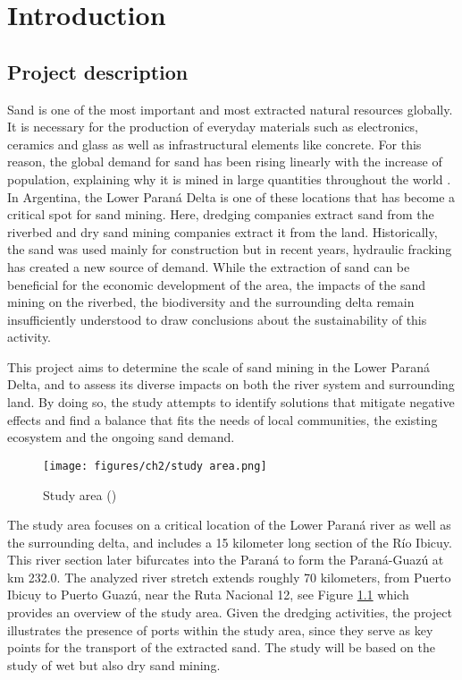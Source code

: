 \chapter{Introduction}
\label{chapter:introduction}

\section{Project description}

Sand is one of the most important and most extracted natural resources globally. It is necessary for the production of everyday materials such as electronics, ceramics and glass as well as infrastructural elements like concrete. For this reason, the global demand for sand has been rising linearly with the increase of population, explaining why it is mined in large quantities throughout the world \autocite{wwfRisingDemandSand}. 
In Argentina, the Lower Paraná Delta is one of these locations that has become a critical spot for sand mining. Here, dredging companies extract  sand from the riverbed and dry sand mining companies extract it from the land. Historically, the sand was used mainly for construction but in recent years, hydraulic fracking has created a new source of demand.
While the extraction of sand can be beneficial for the economic development of the area, the impacts of the sand mining on the riverbed, the biodiversity and the surrounding delta remain insufficiently understood to draw conclusions about the sustainability of this activity. 

This project aims to determine the scale of sand mining in the Lower Paraná Delta, and to assess its diverse impacts on both the river system and surrounding land. By doing so, the study attempts to identify solutions that mitigate negative effects and find a balance that fits the needs of local communities, the existing ecosystem and the ongoing sand demand. 

\begin{figure}[H]
    \centering    \texttt{[image: figures/ch2/study area.png]}
    \caption{Study area (\cite{googleearth2025})}
    \label{fig:study area}
\end{figure}

The study area focuses on a critical location of the Lower Paraná river as well as the surrounding delta, and includes a 15 kilometer long section of the Río Ibicuy. This river section later bifurcates into the Paraná to form the Paraná-Guazú at km 232.0. The analyzed river stretch extends roughly 70 kilometers, from Puerto Ibicuy to Puerto Guazú, near the Ruta Nacional 12, see Figure \ref{fig:study area} which provides an overview of the study area. Given the dredging activities, the project illustrates the presence of ports within the study area, since they serve as key points for the transport of the extracted sand. The study will be based on the study of wet but also dry sand mining.

